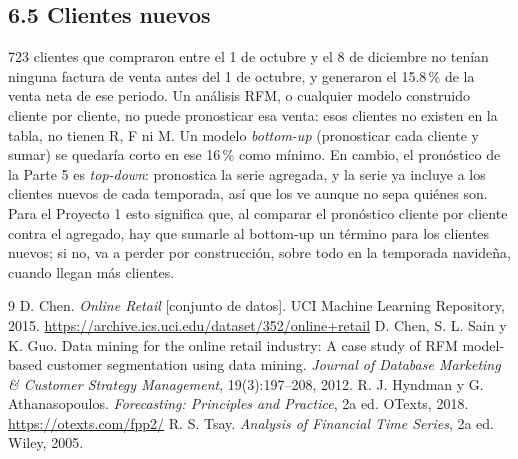 \documentclass[11pt]{article}
\begin{document}
\subsection*{6.5 Clientes nuevos}
723 clientes que compraron entre el 1 de octubre y el 8 de diciembre no tenían ninguna factura de venta antes del 1 de octubre, y generaron el 15.8\,\% de la venta neta de ese periodo. Un análisis RFM, o cualquier modelo construido cliente por cliente, no puede pronosticar esa venta: esos clientes no existen en la tabla, no tienen R, F ni M. Un modelo \emph{bottom-up} (pronosticar cada cliente y sumar) se quedaría corto en ese 16\,\% como mínimo. En cambio, el pronóstico de la Parte 5 es \emph{top-down}: pronostica la serie agregada, y la serie ya incluye a los clientes nuevos de cada temporada, así que los ve aunque no sepa quiénes son. Para el Proyecto 1 esto significa que, al comparar el pronóstico cliente por cliente contra el agregado, hay que sumarle al bottom-up un término para los clientes nuevos; si no, va a perder por construcción, sobre todo en la temporada navideña, cuando llegan más clientes.

\begin{thebibliography}{9}
 D. Chen. \emph{Online Retail} [conjunto de datos]. UCI Machine Learning Repository, 2015. \url{https://archive.ics.uci.edu/dataset/352/online+retail}
 D. Chen, S. L. Sain y K. Guo. Data mining for the online retail industry: A case study of RFM model-based customer segmentation using data mining. \emph{Journal of Database Marketing \& Customer Strategy Management}, 19(3):197--208, 2012.
 R. J. Hyndman y G. Athanasopoulos. \emph{Forecasting: Principles and Practice}, 2a ed. OTexts, 2018. \url{https://otexts.com/fpp2/}
 R. S. Tsay. \emph{Analysis of Financial Time Series}, 2a ed. Wiley, 2005.
\end{thebibliography}
\end{document}
